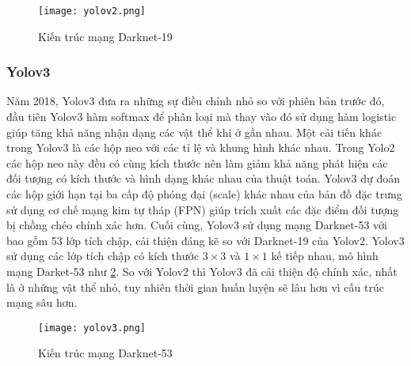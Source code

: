 \documentclass[../the.tex]{subfiles}
\begin{document}
\begin{figure}[H]
	\centering
	\texttt{[image: yolov2.png]}
	\caption{Kiến trúc mạng Darknet-19 \cite{redmon2016yolo9000}}
	\label{fig:yolov2}
\end{figure}
\bigskip

\subsubsection{Yolov3}
{\fontsize{13}{12} \selectfont  
Năm 2018, Yolov3 \cite{redmon2018yolov3} đưa ra những sự điều chỉnh nhỏ so với phiên bản trước đó, đầu tiên Yolov3 hàm softmax để phân loại mà thay vào đó sử dụng
hàm logistic giúp tăng khả năng nhận dạng các vật thể khi ở gần nhau. Một cải tiến khác trong Yolov3 là các hộp neo với các tỉ lệ và khung hình khác nhau. Trong Yolo2 các hộp neo này đều có cùng kích thước 
nên làm giảm khả năng phát hiện các đối tượng có kích thước và hình dạng khác nhau của thuật toán. Yolov3 dự đoán các hộp giới hạn tại ba cấp độ phóng đại (scale) khác nhau của bản đồ đặc trưng sử dụng cơ chế mạng kim tự tháp (FPN)  \cite{lin2017feature}
giúp trích xuất các đặc điểm đối tượng bị chồng chéo chính xác hơn. Cuối cùng, Yolov3 sử dụng mạng Darknet-53 với bao gồm 53 lớp tích chập, cải thiện đáng kẽ so với Darknet-19 của Yolov2.
Yolov3 sử dụng các lớp tích chập có kích thước $3 \times 3 $ và $1 \times 1$ kế tiếp nhau, mô hình mạng Darket-53 như \ref{fig:yolov3}. So với Yolov2 thì Yolov3 đã cải thiện độ chính xác, nhất là ở những vật thể nhỏ, tuy nhiên thời gian huấn luyện sẽ lâu hơn vì cấu trúc mạng sâu hơn.

}

\begin{figure}[H]
	\centering
	\texttt{[image: yolov3.png]}
	\caption{Kiến trúc mạng Darknet-53 \cite{redmon2018yolov3}}
	\label{fig:yolov3}
\end{figure}
\bigskip
\end{document}
